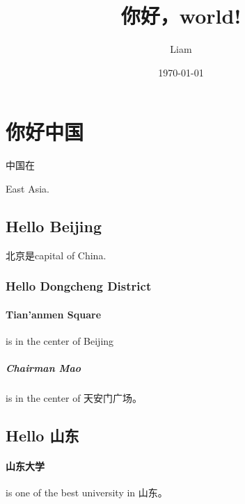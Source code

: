 \documentclass[UTF8]{ctexart}
\title{你好，world!}
\author{Liam}
\date{\today}
\begin{document}
\maketitle
\tableofcontents
\section{你好中国}
中国在

East Asia.
\subsection{Hello Beijing}
北京是capital of China.
\subsubsection{Hello Dongcheng District}
\paragraph{Tian'anmen Square}
is in the center of Beijing
\subparagraph{Chairman Mao}
is in the center of 天安门广场。
\subsection{Hello 山东}
\paragraph{山东大学} is one of the best university in 山东。
\end{document}
